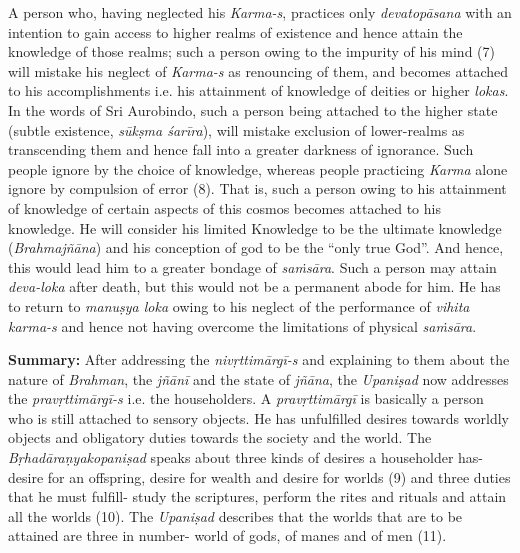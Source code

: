 A person who, having neglected his \emph{Karma-s}, practices only \emph{devato\-pā\-sana} with an intention to gain access to higher realms of existence and hence attain the knowledge of those realms; such a person owing to the impurity of his mind (7) will mistake his neglect of \emph{Karma-s} as renouncing of them, and becomes attached to his accomplishments i.e. his attainment of knowledge of deities or higher \emph{lokas}. In the words of Sri Aurobindo, such a person being attached to the higher state (subtle existence, \emph{sūkṣma śarīra}), will mistake exclusion of lower-realms as transcending them and hence fall into a greater darkness of ignorance. Such people ignore by the choice of knowledge, whereas people practicing \emph{Karma} alone ignore by compulsion of error (8). That is, such a person owing to his attainment of knowledge of certain aspects of this cosmos becomes attached to his knowledge. He will consider his limited Knowledge to be the ultimate knowledge (\emph{Brahmajñāna}) and his conception of god to be the ``only true God''. And hence, this would lead him to a greater bondage of \emph{saṁsāra}. Such a person may attain \emph{deva-loka} after death, but this would not be a permanent abode for him. He has to return to \emph{manuṣya loka} owing to his neglect of the performance of \emph{vihita karma-s} and hence not having overcome the limitations of physical \emph{saṁsāra}.

\textbf{Summary:} After addressing the \emph{nivṛttimārgī-s} and explaining to them about the nature of \emph{Brahman}, the \emph{jñānī} and the state of \emph{jñāna}, the \emph{Upaniṣad} now addresses the \emph{pravṛttimārgī-s} i.e. the householders. A \emph{pravṛttimārgī} is basically a person who is still attached to sensory objects. He has unfulfilled desires towards worldly objects and obligatory duties towards the society and the world. The \emph{Bṛhadāraṇyakopaniṣad} speaks about three kinds of desires a householder has- desire for an offspring, desire for wealth and desire for worlds (9) and three duties that he must fulfill- study the scriptures, perform the rites and rituals and attain all the worlds (10). The \emph{Upaniṣad} describes that the worlds that are to be attained are three in number- world of gods, of manes and of men (11).

